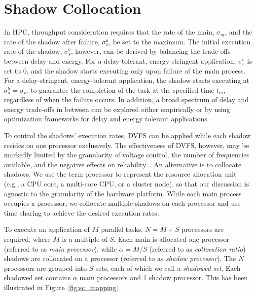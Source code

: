 \section{Shadow Collocation}
\label{sec:shadow_collocation}
In HPC, throughput consideration requires that the rate of the main, $\sigma_m$, and the rate of the shadow after failure, 
$\sigma_s^a$, be set to the maximum. 
The initial execution rate of the shadow, $\sigma_s^b$, however, can be derived by balancing the trade-offs between delay and energy.
For a delay-tolerant, energy-stringent application, $\sigma_s^b$ is set to 0, and the shadow starts executing only upon failure of the main process. 
For a delay-stringent, energy-tolerant application, the shadow starts executing at $\sigma_s^b=\sigma_m$ to guarantee the completion of the task at the specified time $t_m$, regardless of when the failure occurs.  
In addition, a broad spectrum of delay and energy trade-offs in between can be explored either empirically or by using optimization frameworks for delay and energy tolerant applications.


To control the shadows' execution rates, DVFS can be applied while each shadow resides on one processor exclusively. 
The effectiveness of DVFS, however, may be markedly 
limited by the granularity of voltage control, the number of frequencies available, and the negative effects on 
reliability~\cite{Eyerman:2011:FDU:1952998.1952999,Keller:EECS-2015-257,chandra2008defect,zhao2008reliability}. 
An alternative is to collocate shadows.
We use the term processor to represent the resource allocation unit (e.g., a CPU core, a multi-core CPU, or a cluster node), so that our discussion is agnostic to the granularity of the hardware platform. While each main process occupies a processor,  we collocate multiple shadows on each processor and use time sharing to achieve the desired execution rates.


To execute an application of $M$ parallel tasks, $N=M+S$ processors are required, where $M$ is a multiple of $S$. Each main is allocated one processor (referred to as \textit{main processor}), while $\alpha=M/S$ (referred to as \textit{collocation ratio}) shadows are collocated on a processor (referred to as \textit{shadow processor}). 
The $N$ processors are grouped into $S$ sets, each of which we call a \textit{shadowed set}. Each shadowed set contains $\alpha$ main processors and 1 shadow processor.
This has been illustrated in Figure~\ref{fig:sc_mapping}.  

